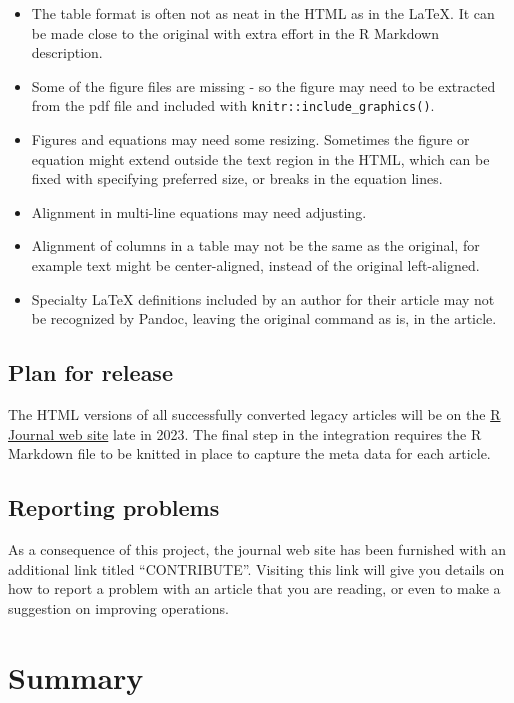 \begin{itemize}
\tightlist
\item
  The table format is often not as neat in the HTML as in the LaTeX. It can be made close to the original with extra effort in the R Markdown description.
\item
  Some of the figure files are missing - so the figure may need to be extracted from the pdf file and included with \texttt{knitr::include\_graphics()}.
\item
  Figures and equations may need some resizing. Sometimes the figure or equation might extend outside the text region in the HTML, which can be fixed with specifying preferred size, or breaks in the equation lines.
\item
  Alignment in multi-line equations may need adjusting.
\item
  Alignment of columns in a table may not be the same as the original, for example text might be center-aligned, instead of the original left-aligned.
\item
  Specialty LaTeX definitions included by an author for their article may not be recognized by Pandoc, leaving the original command as is, in the article.
\end{itemize}

\hypertarget{plan-for-release}{%
\subsection{Plan for release}\label{plan-for-release}}

The HTML versions of all successfully converted legacy articles will be on the \href{https://journal.r-project.org}{R Journal web site} late in 2023. The final step in the integration requires the R Markdown file to be knitted in place to capture the meta data for each article.

\hypertarget{reporting-problems}{%
\subsection{Reporting problems}\label{reporting-problems}}

As a consequence of this project, the journal web site has been furnished with an additional link titled ``CONTRIBUTE''. Visiting this link will give you details on how to report a problem with an article that you are reading, or even to make a suggestion on improving operations.

\hypertarget{summary}{%
\section{Summary}\label{summary}}

